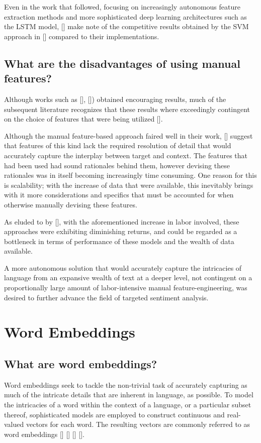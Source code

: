 \documentclass[12pt, a4paper]{report}
\theoremstyle{definition}
\theoremstyle{definition}%
\theoremstyle{definition}%
\theoremstyle{definition}%
\theoremstyle{definition}%
\theoremstyle{definition}%
\renewcommand{\cite}[1]{[\citealp{#1}]}
\begin{document}
Even in the work that followed, focusing on increasingly autonomous feature extraction methods and more sophisticated deep learning architectures such as the LSTM model, \cite{tang2016b} make note of the competitive results obtained by the SVM approach in \cite{kiritchenko} compared to their implementations. 

\subsection{What are the disadvantages of using manual features?}
Although works such as \cite{kiritchenko}, \cite{wagner2014}) obtained encouraging results, much of the subsequent literature recognizes that these results where exceedingly contingent on the choice of features that were being utilized \cite{tang2016b}.

Although the manual feature-based approach faired well in their work, \cite{tang2016b} suggest that features of this kind lack the required resolution of detail that would accurately capture the interplay between target and context. The features that had been used had sound rationales behind them, however devising these rationales was in itself becoming increasingly time consuming. One reason for this is scalability; with the increase of data that were available, this inevitably brings with it more considerations and specifics that must be accounted for when otherwise manually devising these features. 

As eluded to by \cite{zheng2018}, with the aforementioned increase in labor involved, these approaches were exhibiting diminishing returns, and could be regarded as a bottleneck in terms of performance of these models and the wealth of data available. 

A more autonomous solution that would accurately capture the intricacies of language from an expansive wealth of text at a deeper level, not contingent on a proportionally large amount of labor-intensive manual feature-engineering, was desired to further advance the field of targeted sentiment analysis.  


\section{Word Embeddings}
\subsection{What are word embeddings?}
Word embeddings seek to tackle the non-trivial task of accurately capturing as much of the intricate details that are inherent in language, as possible. To model the intricacies of a word within the context of a language, or a particular subset thereof, sophisticated models are employed to construct continuous and real-valued vectors for each word. The resulting vectors are commonly referred to as word embeddings \cite{bengio2003} \cite{mikolov2013} \cite{pennington} \cite{tang}. 
\end{document}
